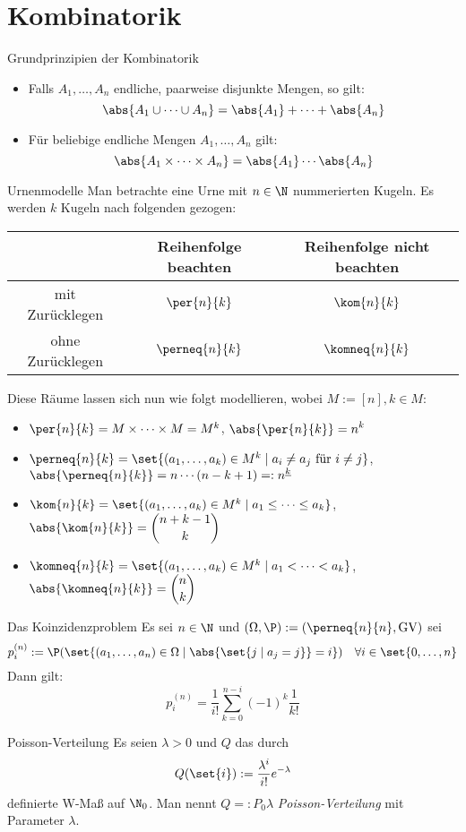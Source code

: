 \section*{Kombinatorik}

\begin{karte}{Grundprinzipien der Kombinatorik}
	\begin{itemize}
		\item Falls $A_1,\dotsc,A_n$ endliche, paarweise disjunkte Mengen, so gilt:
		$$ \abs{A_1 \cup \dots \cup A_n} = \abs{A_1} + \dots + \abs{A_n}$$
		\item Für beliebige endliche Mengen $A_1,\dotsc,A_n$ gilt:
		$$ \abs{A_1 \times \dots \times A_n} = \abs{A_1} \dotsm \abs{A_n}$$
	\end{itemize}
\end{karte}

\begin{karte}{Urnenmodelle}
	Man betrachte eine Urne mit $n \in \N$ nummerierten Kugeln. Es werden $k$ Kugeln nach folgenden  gezogen:
	\begin{center}
		\begin{tabular}{c||c|c}
			& Reihenfolge beachten & Reihenfolge nicht beachten \\
			\hline \hline
			mit Zurücklegen & $\per{n}{k}$ & $\kom{n}{k}$ \\ \hline
			ohne Zurücklegen & $\perneq{n}{k}$ & $\komneq{n}{k}$ \\
		\end{tabular}
	\end{center}
	Diese Räume lassen sich nun wie folgt modellieren, wobei $M:=[n], k \in M$:
	\begin{itemize}
		\item $\per{n}{k}=M\times \dots \times M = M^k$, $ \displaystyle \abs{\per{n}{k}}=n^k$
		\item $\perneq{n}{k}=\set{(a_1,\dotsc,a_k) \in M^k \;|\; a_i \neq a_j \text{ für } i \neq j}$, \\ $\displaystyle \abs{\perneq{n}{k}}=n\dotsm (n-k+1) =: n^{\underline{k}}$
		\item $\kom{n}{k}=\set{(a_1,\dotsc,a_k) \in M^k \;|\; a_1 \leq \dots \leq a_k}$, $\displaystyle \abs{\kom{n}{k}}=\binom{n+k-1}{k}$
		\item $\komneq{n}{k}=\set{(a_1,\dotsc,a_k) \in M^k \;|\; a_1 < \dots < a_k}$, $\displaystyle \abs{\komneq{n}{k}}=\binom{n}{k}$
	\end{itemize}
\end{karte}

\begin{karte}{Das Koinzidenzproblem}
	Es sei $n \in \N$ und $(\Omega,\P):=(\perneq{n}{n},\text{GV})$ sei 
	$$p_i^{(n)}:=\P({\set{(a_1,\dotsc,a_n) \in \Omega \;|\; \abs{\set{j \;|\; a_j = j}} = i}}) \quad \forall i \in \set{0,\dotsc,n}$$
	Dann gilt:
	$$p_i^{(n)}=\frac{1}{i!}\sum_{k=0}^{n-i} (-1)^k \frac{1}{k!}$$
\end{karte}

\begin{karte}{Poisson-Verteilung}
	Es seien $\lambda > 0$ und $Q$ das durch $$Q(\set{i}):=\frac{\lambda ^{i}}{i!}e^{-\lambda}$$ definierte W-Maß auf $\N_0$. Man nennt $Q=:P_0{\lambda}$ \textit{Poisson-Verteilung} mit Parameter $\lambda$. 
\end{karte}